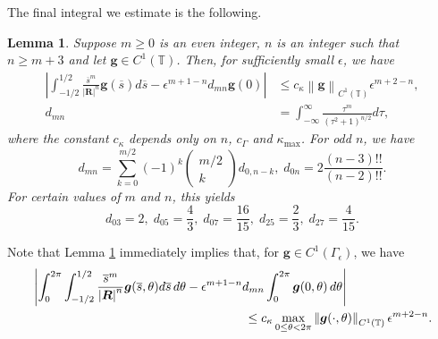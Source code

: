 \documentclass[11pt]{article}
\numberwithin{equation}{section}
\newcommand{\T}{\mathbb{T}}
\newcommand{\bars}{\overline s}
\newcommand{\ts}{\thinspace}
\newcommand{\abs}[1]{\left\lvert #1 \right\rvert}
\newcommand{\norm}[1]{\left\lVert #1 \right\rVert}
\newtheorem{lemma}[theorem]{Lemma}
\theoremstyle{definition}
\begin{document}
The final integral we estimate is the following.
\begin{lemma}\label{Rintest2}
Suppose $m\ge 0$ is an even integer, $n$ is an integer such that $n\ge m+3$ and let $\bm{g}\in C^1(\T)$. Then, for sufficiently small $\epsilon$, we have
\begin{equation}\label{epsdmn}
\begin{split}
\abs{\int_{-1/2}^{1/2} \frac{\bars^m}{\abs{\bm{R}}^n}\bm{g}(\bars)d\bars -\epsilon^{m+1-n}d_{mn} \bm{g}(0)} 
&\le c_\kappa\norm{\bm{g}}_{C^1(\T)}\epsilon^{m+2-n},\\
d_{mn}&=\int_{-\infty}^\infty \frac{\tau^m}{(\tau^2+1)^{n/2}}d\tau,
\end{split}
\end{equation}
where the constant $c_\kappa$ depends only on $n$, $c_\Gamma$ and $\kappa_{\max}$. For odd $n$, we have
\begin{equation}
d_{mn}=\sum_{k=0}^{m/2}(-1)^k\begin{pmatrix} m/2\\ 
k \end{pmatrix} d_{0,n-k},\;
d_{0n}=2\frac{(n-3)!!}{(n-2)!!}.
\end{equation}
For certain values of $m$ and $n$, this yields
\begin{equation}
d_{03}=2, \; d_{05}=\frac{4}{3}, \; d_{07}= \frac{16}{15}, \; d_{25}=\frac{2}{3}, \; d_{27}=\frac{4}{15}.
\end{equation}
\end{lemma}

Note that Lemma \ref{Rintest2} immediately implies that, for $\bm{g}\in C^1(\Gamma_\epsilon)$, we have  
\begin{equation}\label{epsdmn_theta}
\begin{aligned}
&\abs{\int_0^{2\pi}\int_{-1/2}^{1/2} \frac{\bars^m}{\abs{\bm{R}}^n}\bm{g}(\bars,\theta) d\bars \ts d\theta -\epsilon^{m+1-n}d_{mn} \int_0^{2\pi}\bm{g}(0,\theta)\ts d\theta} \\
&\hspace{6cm} \le c_\kappa\max_{0\le\theta<2\pi}\norm{\bm{g}(\cdot,\theta)}_{C^1(\T)}\epsilon^{m+2-n}.
\end{aligned}
\end{equation}
\end{document}
